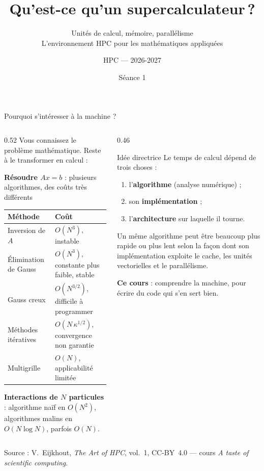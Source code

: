 \documentclass[8pt,aspectratio=169]{beamer}
\title{Qu'est-ce qu'un supercalculateur\,?}
\subtitle{Unités de calcul, mémoire, parallélisme\\
\small L'environnement HPC pour les mathématiques appliquées}
\author{HPC --- 2026-2027}
\date{Séance 1}
\newcommand{\src}[1]{\vfill{\tiny\color{gray}Source : #1\par}}
\newcommand{\eij}{V.~Eijkhout, \emph{The Art of HPC}, vol.~1, CC-BY~4.0}
\begin{document}
\maketitle

\begin{frame}{Pourquoi s'intéresser à la machine ?}
\begin{columns}[T]
\begin{column}{0.52\textwidth}
Vous connaissez le problème mathématique. Reste à le transformer en calcul :

\medskip
\textbf{Résoudre $Ax=b$} : plusieurs algorithmes, des coûts très différents

\smallskip
\begin{tabular}{@{}p{2.6cm}p{4.9cm}@{}}
\toprule
Méthode & Coût\\
\midrule
Inversion de $A$ & $O(N^3)$, instable\\
Élimination de Gauss & $O(N^3)$, constante plus faible, stable\\
Gauss creux & $O(N^{3/2})$, difficile à programmer\\
Méthodes itératives & $O(N\,\kappa^{1/2})$, convergence non garantie\\
Multigrille & $O(N)$, applicabilité limitée\\
\bottomrule
\end{tabular}

\medskip
\textbf{Interactions de $N$ particules} : algorithme naïf en $O(N^2)$, algorithmes malins en $O(N\log N)$, parfois $O(N)$.
\end{column}
\begin{column}{0.46\textwidth}
\begin{block}{Idée directrice}
Le temps de calcul dépend de trois choses :
\begin{enumerate}
\item l'\textbf{algorithme} (analyse numérique) ;
\item son \textbf{implémentation} ;
\item l'\textbf{architecture} sur laquelle il tourne.
\end{enumerate}
\end{block}
Un même algorithme peut être beaucoup plus rapide ou plus lent selon la façon dont son implémentation exploite le cache, les unités vectorielles et le parallélisme.

\medskip
\textbf{Ce cours} : comprendre la machine, pour écrire du code qui s'en sert bien.
\end{column}
\end{columns}
\src{\eij{} --- cours \emph{A taste of scientific computing}.}
\end{frame}
\end{document}

